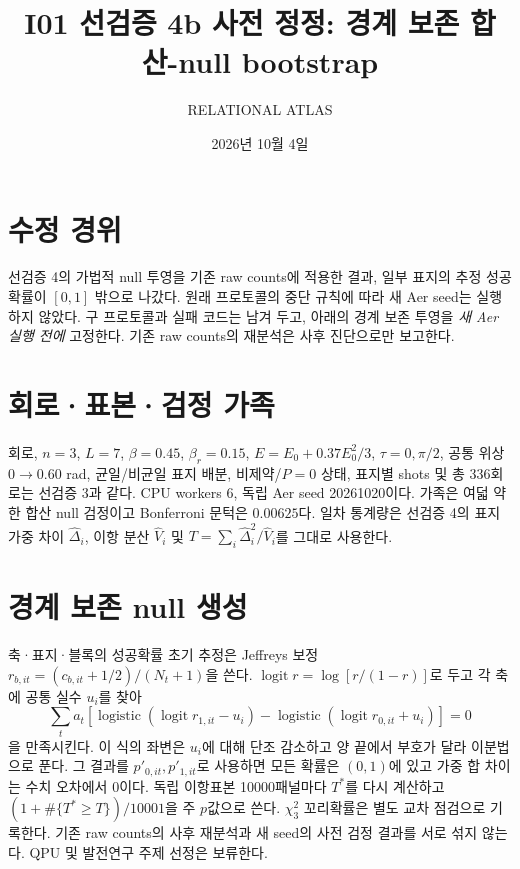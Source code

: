\documentclass[11pt,a4paper]{article}
\title{I01 선검증 4b 사전 정정: 경계 보존 합산-null bootstrap}
\author{RELATIONAL ATLAS}
\date{2026년 10월 4일}
\begin{document}
\maketitle

\section{수정 경위}
선검증 4의 가법적 null 투영을 기존 raw counts에 적용한 결과,
일부 표지의 추정 성공확률이 $[0,1]$ 밖으로 나갔다.
원래 프로토콜의 중단 규칙에 따라 새 Aer seed는 실행하지 않았다.
구 프로토콜과 실패 코드는 남겨 두고, 아래의 경계 보존 투영을
\emph{새 Aer 실행 전에} 고정한다. 기존 raw counts의 재분석은
사후 진단으로만 보고한다.

\section{회로·표본·검정 가족}
회로, $n=3$, $L=7$, $\beta=0.45$, $\beta_r=0.15$,
$E=E_0+0.37E_0^2/3$, $\tau=0,\pi/2$, 공통 위상
$0\to0.60$ rad, 균일/비균일 표지 배분, 비제약/$P=0$ 상태,
표지별 shots 및 총 336회로는 선검증 3과 같다. CPU workers 6,
독립 Aer seed 20261020이다. 가족은 여덟 약한 합산 null 검정이고
Bonferroni 문턱은 $0.00625$다. 일차 통계량은 선검증 4의
표지 가중 차이 $\hat\Delta_i$, 이항 분산 $\hat V_i$ 및
$T=\sum_i\hat\Delta_i^2/\hat V_i$를 그대로 사용한다.

\section{경계 보존 null 생성}
축·표지·블록의 성공확률 초기 추정은 Jeffreys 보정
$r_{b,it}=(c_{b,it}+1/2)/(N_t+1)$을 쓴다.
$\operatorname{logit}r=\log[r/(1-r)]$로 두고 각 축에 공통
실수 $u_i$를 찾아
\begin{equation}
\sum_t a_t\left[
\operatorname{logistic}(\operatorname{logit}r_{1,it}-u_i)-
\operatorname{logistic}(\operatorname{logit}r_{0,it}+u_i)
\right]=0
\end{equation}
을 만족시킨다. 이 식의 좌변은 $u_i$에 대해 단조 감소하고
양 끝에서 부호가 달라 이분법으로 푼다.
그 결과를 $p'_{0,it},p'_{1,it}$로 사용하면 모든 확률은 $(0,1)$에
있고 가중 합 차이는 수치 오차에서 0이다.
독립 이항표본 10000패널마다 $T^*$를 다시 계산하고
$(1+\#\{T^*\ge T\})/10001$을 주 $p$값으로 쓴다.
$\chi^2_3$ 꼬리확률은 별도 교차 점검으로 기록한다.
기존 raw counts의 사후 재분석과 새 seed의 사전 검정 결과를
서로 섞지 않는다. QPU 및 발전연구 주제 선정은 보류한다.
\end{document}
